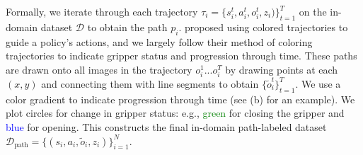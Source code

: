 Formally, we iterate 
through each trajectory $\tau_i = \{s_i^t, a_i^t, o_i^t, z_i)\}_{t=1}^T$ on the in-domain dataset $\mathcal{D}$ to obtain the path $p_i$. 
\citet{gu2023rttrajectory} proposed using colored trajectories to guide a policy's actions, and we largely follow their method of coloring trajectories to indicate gripper status and progression through time. 
These paths are drawn onto all images in the trajectory $o_i^1...o_i^T$ by drawing points at each $(x, y)$ and connecting them with line segments to obtain $\{\tilde{o}_i^t\}_{t=1}^T$.
We use a color gradient to indicate progression through time (see (b) for an example).
We plot circles for change in gripper status: e.g., \textcolor{green}{green} for closing the gripper and \textcolor{blue}{blue} for opening.
This constructs the final in-domain path-labeled dataset $\mathcal{D}_\text{path} = \{ (s_i, a_i,\tilde{o}_i, z_i)\}_{i=1}^N$.






